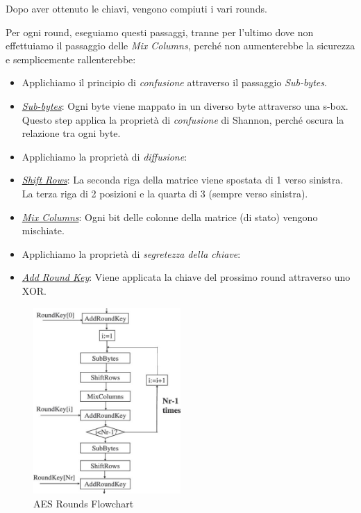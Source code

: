  

\textsf{\small Dopo aver ottenuto le chiavi, vengono compiuti i vari rounds.} 

\textsf{\small Per ogni round, eseguiamo questi passaggi, tranne per l'ultimo dove non effettuiamo il passaggio delle \emph{Mix Columns}, perché non aumenterebbe la sicurezza e semplicemente rallenterebbe: } %

       

\begin{itemize}
	\item[] \textsf{\small Applichiamo il principio di \emph{confusione} attraverso il passaggio \emph{Sub-bytes}.}
	\item \textsf{\small \underline{\emph{Sub-bytes}}: Ogni byte viene mappato in un diverso byte attraverso una s-box. Questo step applica la proprietà di \emph{confusione} di Shannon, perché oscura la relazione tra ogni byte.}
	\item[] \textsf{\small Applichiamo la proprietà di \emph{diffusione}:}
	\item \textsf{\small \underline{\emph{Shift Rows}}: La seconda riga della matrice viene spostata di 1 verso sinistra. La terza riga di 2 posizioni e la quarta di 3 (sempre verso sinistra).}
	\item \textsf{\small \underline{\emph{Mix Columns}}: Ogni bit delle colonne della matrice (di stato) vengono mischiate.} %
	\item[] \textsf{\small Applichiamo la proprietà di \emph{segretezza della chiave}:}
	\item \textsf{\small \underline{\emph{Add Round Key}}: Viene applicata la chiave del prossimo round attraverso uno XOR.} %
\end{itemize}

\begin{figure}[H] %
	\centering
	\includegraphics[width=0.5\textwidth, height=0.5\textheight, keepaspectratio]{./images/aes/flowcharts/aes_flowchart.png}
	\caption{AES Rounds Flowchart}
	\label{fig:aes_flowchart2}
\end{figure}

